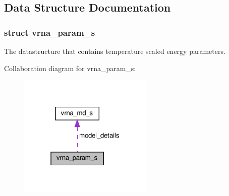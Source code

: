 \subsection{Data Structure Documentation}
\label{structvrna__param__s}
\subsubsection{struct vrna\+\_\+param\+\_\+s}
The datastructure that contains temperature scaled energy parameters. 

Collaboration diagram for vrna\+\_\+param\+\_\+s\+:
\nopagebreak
\begin{figure}[H]
\begin{center}
\leavevmode
\includegraphics[width=183pt]{structvrna__param__s__coll__graph}
\end{center}
\end{figure}
